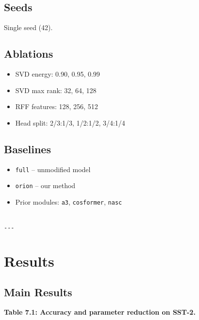 \subsection{Seeds}

Single seed (42).

\subsection{Ablations}

\begin{itemize}
\item SVD energy: 0.90, 0.95, 0.99
\item SVD max rank: 32, 64, 128
\item RFF features: 128, 256, 512
\item Head split: 2/3:1/3, 1/2:1/2, 3/4:1/4

\end{itemize}
\subsection{Baselines}

\begin{itemize}
\item \texttt{full} -- unmodified model
\item \texttt{orion} -- our method
\item Prior modules: \texttt{a3}, \texttt{cosformer}, \texttt{nasc}
\end{itemize}
\begin{lstlisting}

---
\end{lstlisting}


\section{Results}

\subsection{Main Results}

\textbf{Table 7.1: Accuracy and parameter reduction on SST-2.}

